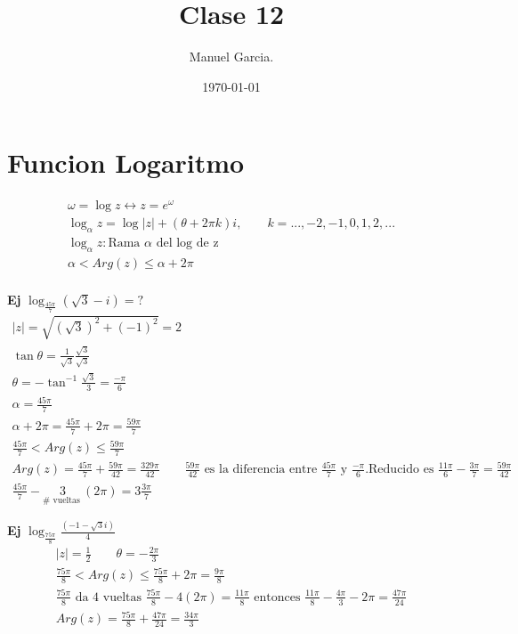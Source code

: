 \documentclass{article}
\title{Clase 12 }
\author{Manuel Garcia.}
\date{\today}
\newcommand{\caja}[3]{%
  \begin{tcolorbox}[colback=#1!5!white,colframe=#1!25!black,title=#2]
    #3
  \end{tcolorbox}%
}
\begin{document}
\maketitle

\section{Funcion Logaritmo }
\caja{red}{}{
  \begin{gather*}
    \omega = \log{z } \leftrightarrow z =  e ^ {\omega}\\
    \log_\alpha {z} = \log{\left|z \right|} + (\theta + 2 \pi k )i , \qquad k = ...,-2,-1,0,1,2,...\\
    \log_\alpha z: \text{Rama }\alpha \text{ del log de z }\\
    \alpha < Arg(z) \leq \alpha+ 2 \pi\\
  \end{gather*}
}

\textbf{Ej } $ \log_{\frac{45 \pi}{7 }} (\sqrt{3 } - i  ) = ? $
\begin{gather*}
  \left|z \right| = \sqrt{(\sqrt{3 } )^2 + (-1)^2 } = 2\\ 
  \tan{\theta} = \frac{1}{\sqrt{3 } }\frac{\sqrt{3 } }{\sqrt{3 } }\\
  \theta = -\tan ^ {-1 }{\frac{\sqrt{3 } }{3 }} = \frac{- \pi}{6 }\\
  \alpha = \frac{45 \pi }{7 }\\
  \alpha + 2 \pi = \frac{45 \pi}{7 }+ 2 \pi = \frac{59 \pi}{7 }\\
  \frac{45 \pi }{7 } < Arg(z) \leq \frac{59 \pi }{7 }\\
  Arg(z) = \frac{45 \pi }{7 } + \frac{59\pi }{42 } = \frac{329 \pi }{42} \qquad \frac{59\pi }{42 }\text{ es la diferencia entre }\frac{45\pi}{7} \text{ y } \frac{-\pi}{6 }. \text{Reducido es }\frac{11 \pi }{6 }- \frac{3 \pi }{7 } = \frac{59 \pi}{42 }\\
  \frac{45\pi}{7 } - \underset{\# \text{ vueltas }}{3 }(2\pi ) = 3 \frac{3 \pi}{7 }
\end{gather*}

\textbf{Ej }$ \log_ \frac{75 \pi }{8 }\frac{(-1 -\sqrt{3 }i  )}{4 }$
\begin{gather*}
  \left|z \right| = \frac{1}{2} \qquad \theta = - \frac{2\pi}{3 }\\
  \frac{75 \pi}{8 }< Arg(z) \leq \frac{75\pi }{8 }+ 2\pi= \frac{9\pi}{8 }\\
  \frac{75 \pi}{8 } \text{ da 4 vueltas } \frac{75 \pi}{8 } - 4(2\pi)= \frac{11\pi}{8 } \text{ entonces } \frac{11\pi}{8 }- \frac{4\pi}{3 } - 2\pi = \frac{47 \pi}{24 }\\
  Arg(z) = \frac{75 \pi }{8 }+ \frac{47 \pi}{24 } = \frac{34 \pi}{3}
\end{gather*}
\end{document}
